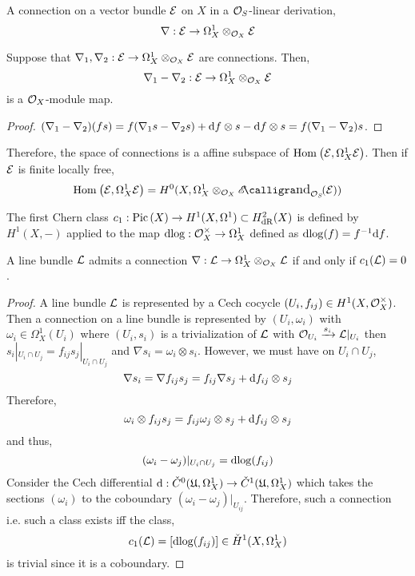 \documentclass[12pt]{article}
\renewcommand{\U}{\mathfrak{U}}
\begin{document}
\begin{defn}
A connection on a vector bundle $\mathcal{E}$ on $X$ in a $\mathcal{O}_{S}$-linear derivation, 
\[ \nabla : \mathcal{E} \to \Omega^1_X \otimes_{\mathcal{O}_{X}} \mathcal{E} \]
\end{defn}

\begin{lemma}
Suppose that $\nabla_1, \nabla_2 : \mathcal{E} \to \Omega^1_X \otimes_{\mathcal{O}_{X}} \mathcal{E}$ are connections. Then,
\[ \nabla_1 - \nabla_2 : \mathcal{E} \to \Omega^1_X \otimes_{\mathcal{O}_{X}} \mathcal{E} \]
is a $\mathcal{O}_{X}$-module map.
\end{lemma}

\begin{proof}
$(\nabla_1 - \nabla_2)(fs) = f (\nabla_1 s  - \nabla_2 s) + \mathrm{d}{f} \otimes s - \mathrm{d}{f} \otimes s = f (\nabla_1 - \nabla_2) s$.
\end{proof}

\begin{rmk}
Therefore, the space of connections is a affine subspace of $\mathrm{Hom}_{} \left( \mathcal{E}, \Omega^1_X \mathcal{E} \right)$. Then if $\mathcal{E}$ is finite locally free, 
\[ \Hom{}{\E}{\Omega^1_X \E} = H^0(X, \Omega^1_X \otimes_{\struct{X}} \shEnd{\struct{S}}{\E}) \]
\end{rmk}

\begin{defn}
The first Chern class $c_1 : \mathrm{Pic} \left( X \right) \to H^1(X, \Omega^1) \subset H^2_{\mathrm{dR}}(X)$ is defined by $H^1(X, -)$ applied to the map $\mathrm{d}{\log} : \mathcal{O}_{X}^\times \to \Omega^1_X$ defined as $\mathrm{d}{\log}(f) = f^{-1} \mathrm{d}{f}$.
\end{defn}

\begin{prop}
A line bundle $\mathcal{L}$ admits a connection $\nabla : \mathcal{L} \to \Omega^1_X \otimes_{\mathcal{O}_{X}} \mathcal{L}$ if and only if $c_1(\mathcal{L}) = 0$.
\end{prop}

\begin{proof}
A line bundle $\mathcal{L}$ is represented by a Cech cocycle $(U_i, f_{ij}) \in H^1(X, \mathcal{O}_{X}^\times)$. Then a connection on a line bundle is represented by $(U_i, \omega_i)$ with $\omega_i \in \Omega^1_X(U_i)$ where $(U_i, s_i)$ is a trivialization of $\mathcal{L}$ with $\mathcal{O}_{U_i} \xrightarrow{s_i} \mathcal{L}|_{U_i}$ then $s_i |_{U_i \cap U_j} = f_{ij} s_j |_{U_i \cap U_j}$ and $\nabla s_i = \omega_i \otimes s_i$. However, we must have on $U_i \cap U_j$,
\[ \nabla s_i = \nabla f_{ij} s_j = f_{ij} \nabla s_j + \mathrm{d}{f_{ij}} \otimes s_j \]
Therefore,
\[ \omega_i \otimes f_{ij} s_j = f_{ij} \omega_j \otimes s_j + \mathrm{d}{f_{ij}} \otimes s_j \]
and thus,
\[ (\omega_i - \omega_j)|_{U_i \cap U_j} = \mathrm{d}{\log}(f_{ij}) \]
Consider the Cech differential $\d : \check{C}^0(\U, \Omega^1_X) \to \check{C}^1(\U, \Omega^1_X)$ which takes the sections $(\omega_i)$ to the coboundary $(\omega_i - \omega_j)|_{U_{ij}}$. Therefore, such a connection i.e. such a class exists iff the class,
\[ c_1(\mathcal{L}) = [\mathrm{d}{\log}(f_{ij})] \in \check{H}^1(X, \Omega^1_X) \]
is trivial since it is a coboundary. 
\end{proof}
\end{document}
